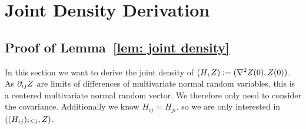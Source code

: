 \section{Joint Density Derivation }

\subsection{Proof of Lemma~\ref{lem: joint density}}\label{subsec: joint density derivation}

In this section we want to derive the joint density of \((H,Z):=
(\nabla^2Z(0), Z(0))\). As \(\partial_{ij}Z\) are limits of differences
of multivariate normal random variables, this is a centered multivariate normal
random vector. We therefore only need to consider the covariance. Additionally
we know \(H_{ij} = H_{ji}\), so we are only interested
in \(((H_{ij})_{i\le j}, Z)\).


